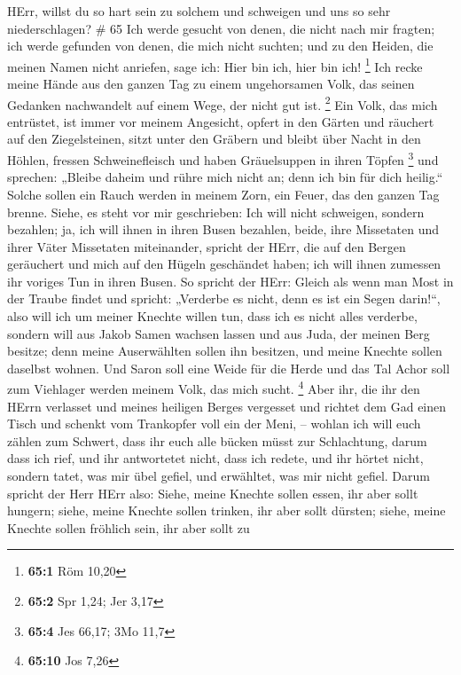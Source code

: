 HErr, willst du so hart sein zu solchem und schweigen und uns so sehr
niederschlagen? \# 65  Ich werde gesucht von denen, die
nicht nach mir fragten; ich werde gefunden von denen, die mich nicht
suchten; und zu den Heiden, die meinen Namen nicht anriefen, sage ich:
Hier bin ich, hier bin ich! \footnote{\textbf{65:1} Röm 10,20}
 Ich recke meine Hände aus den ganzen Tag zu einem
ungehorsamen Volk, das seinen Gedanken nachwandelt auf einem Wege, der
nicht gut ist. \footnote{\textbf{65:2} Spr 1,24; Jer 3,17} 
Ein Volk, das mich entrüstet, ist immer vor meinem Angesicht, opfert in
den Gärten und räuchert auf den Ziegelsteinen,  sitzt unter
den Gräbern und bleibt über Nacht in den Höhlen, fressen Schweinefleisch
und haben Gräuelsuppen in ihren Töpfen \footnote{\textbf{65:4} Jes
  66,17; 3Mo 11,7}  und sprechen: „Bleibe daheim und rühre
mich nicht an; denn ich bin für dich heilig.`` Solche sollen ein Rauch
werden in meinem Zorn, ein Feuer, das den ganzen Tag brenne.
 Siehe, es steht vor mir geschrieben: Ich will nicht
schweigen, sondern bezahlen; ja, ich will ihnen in ihren Busen bezahlen,
 beide, ihre Missetaten und ihrer Väter Missetaten
miteinander, spricht der HErr, die auf den Bergen geräuchert und mich
auf den Hügeln geschändet haben; ich will ihnen zumessen ihr voriges Tun
in ihren Busen.  So spricht der HErr: Gleich als wenn man
Most in der Traube findet und spricht: „Verderbe es nicht, denn es ist
ein Segen darin!{}``, also will ich um meiner Knechte willen tun, dass
ich es nicht alles verderbe,  sondern will aus Jakob Samen
wachsen lassen und aus Juda, der meinen Berg besitze; denn meine
Auserwählten sollen ihn besitzen, und meine Knechte sollen daselbst
wohnen.  Und Saron soll eine Weide für die Herde und das
Tal Achor soll zum Viehlager werden meinem Volk, das mich sucht.
\footnote{\textbf{65:10} Jos 7,26}  Aber ihr, die ihr den
HErrn verlasset und meines heiligen Berges vergesset und richtet dem Gad
einen Tisch und schenkt vom Trankopfer voll ein der Meni, --
 wohlan ich will euch zählen zum Schwert, dass ihr euch
alle bücken müsst zur Schlachtung, darum dass ich rief, und ihr
antwortetet nicht, dass ich redete, und ihr hörtet nicht, sondern tatet,
was mir übel gefiel, und erwähltet, was mir nicht gefiel. 
Darum spricht der Herr HErr also: Siehe, meine Knechte sollen essen, ihr
aber sollt hungern; siehe, meine Knechte sollen trinken, ihr aber sollt
dürsten; siehe, meine Knechte sollen fröhlich sein, ihr aber sollt zu
